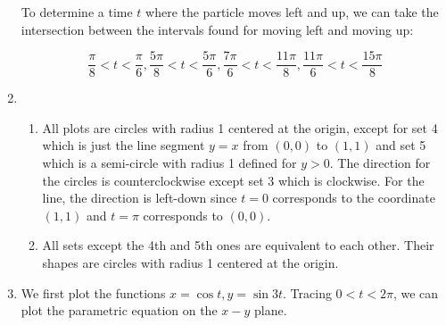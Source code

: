 \begin{enumerate}
        To determine a time $t$ where the particle moves left and up, we can take the intersection between the intervals found for moving left and moving up:
        
        \[
            \frac{\pi}{8} < t < \frac{\pi}{6}, \frac{5\pi}{8} < t < \frac{5\pi}{6}, \frac{7\pi}{6} < t < \frac{11\pi}{8}, \frac{11\pi}{6} < t < \frac{15\pi}{8}
        \]

    \item 
    \begin{enumerate}
        \item All plots are circles with radius 1 centered at the origin, except for set 4 which is just the line segment $y=x$ from $(0,0)$ to $(1,1)$ and set 5 which is a semi-circle with radius 1 defined for $y > 0$. The direction for the circles is counterclockwise except set 3 which is clockwise. For the line, the direction is left-down since $t=0$ corresponds to the coordinate $(1,1)$ and $t=\pi$ corresponds to $(0,0)$.

        \item All sets except the 4th and 5th ones are equivalent to each other. Their shapes are circles with radius 1 centered at the origin.
    \end{enumerate}

    \item
    We first plot the functions $x=\cos{t}, y=\sin{3t}$. Tracing $0 < t < 2\pi$, we can plot the parametric equation on the $x-y$ plane.
	
	    \begin{figure}[!ht]
	    \centering
    
    

\end{figure}
\end{enumerate}
